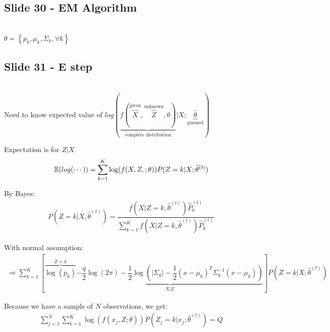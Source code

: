 \subsection{Slide 30 - EM Algorithm}\hfill\\
$\theta = \left\{p_k,\mu_k,\Sigma_k,\forall k\right\}$
\par\bigskip
\subsection{Slide 31 - E step}\hfill\\
\noindent Need to know expected value of $log(\underbrace{f(\overbrace{X}^{\text{given}},\overbrace{Z}^{\text{unknown}},\theta)}_{\text{complete distribution}}|X;\underbrace{\widehat{\theta}}_{\text{guessed}})$
\par\bigskip
\noindent Expectation is for $Z|X$
\begin{equation*}
  \begin{gathered}
    \mathbb{E}(log(\cdots)) = \sum_{k=1}^{K}\log(f(X,Z,;\theta))P(Z=k|X;\widehat{\theta}^{(t)})
  \end{gathered}
\end{equation*}\par
\noindent By Bayes: 
\begin{equation*}
  \begin{gathered}
    P(Z=k|X,\widehat{\theta}^{(t)}) = \dfrac{f(X|Z=k,\widehat{\theta}^{(t)})\widehat{P}_k^{(t)}}{\sum_{k=1}^{K}f(X|Z=k,\widehat{\theta}^{(t)})\widehat{P}_k^{(t)}}
  \end{gathered}
\end{equation*}\par
\noindent With normal assumption:
\begin{equation*}
  \begin{gathered}
    \Rightarrow \sum_{k=1}^{K}\left[\overbrace{\log(p_k)}^{Z=k}\underbrace{-\dfrac{q}{2}\log(2\pi)-\dfrac{1}{2}\log(\left|\Sigma_k\right|-\dfrac{1}{2}(x-\mu_k)^T\Sigma_k^{-1}(x-\mu_k))}_{X|Z}\right]P(Z=k|X;\widehat{\theta}^{(t)})
  \end{gathered}
\end{equation*}\par
\noindent Because we have a sample of $N$ observations, we get:
\begin{equation*}
  \begin{gathered}
    \sum_{j=1}^{N}\sum_{k=1}^{K}\log(f(x_j,Z;\theta))P(Z_j=k|x_j;\widehat{\theta}^{(t)}) = Q
  \end{gathered}
\end{equation*}\par
